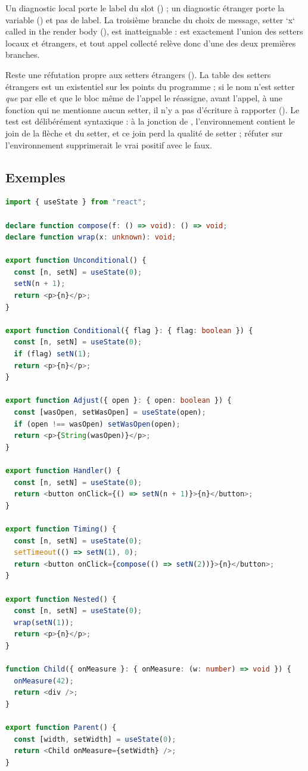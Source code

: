Un diagnostic local porte le label du slot (\code{[hook:N]}) ; un diagnostic étranger porte la variable () et pas de label. La troisième branche du choix de message, \og setter `x` called in the render body\fg{} (), est inatteignable :  est exactement l'union des setters locaux et étrangers, et tout appel collecté relève donc d'une des deux premières branches.

Reste une réfutation propre aux setters étrangers (). La table des setters étrangers est un existentiel sur les points du programme ; si le nom n'est setter \emph{que} par elle et que le bloc même de l'appel le réassigne, avant l'appel, à une fonction qui ne mentionne aucun setter, il n'y a pas d'écriture à rapporter (). Le test est délibérément syntaxique : à la jonction de , l'environnement contient le join de la flèche et du setter, et ce join perd la qualité de setter ; réfuter sur l'environnement supprimerait le vrai positif avec le faux.

\subsection{Exemples}

\begin{lstlisting}[language=TypeScript,caption={Six manières d'appeler un setter depuis le rendu (\file{/tmp/ch18/setter.tsx})},label={lst:regles-etat-sir-ex}]
import { useState } from "react";

declare function compose(f: () => void): () => void;
declare function wrap(x: unknown): void;

export function Unconditional() {
  const [n, setN] = useState(0);
  setN(n + 1);
  return <p>{n}</p>;
}

export function Conditional({ flag }: { flag: boolean }) {
  const [n, setN] = useState(0);
  if (flag) setN(1);
  return <p>{n}</p>;
}

export function Adjust({ open }: { open: boolean }) {
  const [wasOpen, setWasOpen] = useState(open);
  if (open !== wasOpen) setWasOpen(open);
  return <p>{String(wasOpen)}</p>;
}

export function Handler() {
  const [n, setN] = useState(0);
  return <button onClick={() => setN(n + 1)}>{n}</button>;
}

export function Timing() {
  const [n, setN] = useState(0);
  setTimeout(() => setN(1), 0);
  return <button onClick={compose(() => setN(2))}>{n}</button>;
}

export function Nested() {
  const [n, setN] = useState(0);
  wrap(setN(1));
  return <p>{n}</p>;
}

function Child({ onMeasure }: { onMeasure: (w: number) => void }) {
  onMeasure(42);
  return <div />;
}

export function Parent() {
  const [width, setWidth] = useState(0);
  return <Child onMeasure={setWidth} />;
}
\end{lstlisting}

